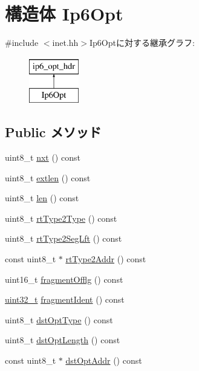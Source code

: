 \hypertarget{structNet_1_1Ip6Opt}{
\section{構造体 Ip6Opt}
\label{structNet_1_1Ip6Opt}
}


{\ttfamily \#include $<$inet.hh$>$}Ip6Optに対する継承グラフ:\begin{figure}[H]
\begin{center}
\leavevmode
\includegraphics[height=2cm]{structNet_1_1Ip6Opt}
\end{center}
\end{figure}
\subsection*{Public メソッド}
\begin{DoxyCompactItemize}
\item 
uint8\_\-t \hyperlink{structNet_1_1Ip6Opt_aa9a773e8c63669710e2900218d27c6ef}{nxt} () const 
\item 
uint8\_\-t \hyperlink{structNet_1_1Ip6Opt_a7534c13a4cde0c08f78d23e82ae8a95a}{extlen} () const 
\item 
uint8\_\-t \hyperlink{structNet_1_1Ip6Opt_a157a538f6c0e591c974744259b42d8f3}{len} () const 
\item 
uint8\_\-t \hyperlink{structNet_1_1Ip6Opt_ae4c748b4f01abc85d308a627b0278519}{rtType2Type} () const 
\item 
uint8\_\-t \hyperlink{structNet_1_1Ip6Opt_abd5ab0d9ec38e56938b883bf078a505e}{rtType2SegLft} () const 
\item 
const uint8\_\-t $\ast$ \hyperlink{structNet_1_1Ip6Opt_aa75855e56afe6f1a873a89ec9065eece}{rtType2Addr} () const 
\item 
uint16\_\-t \hyperlink{structNet_1_1Ip6Opt_abfef731b01a07ca7e0e74553e1c2a003}{fragmentOfflg} () const 
\item 
\hyperlink{Type_8hh_a435d1572bf3f880d55459d9805097f62}{uint32\_\-t} \hyperlink{structNet_1_1Ip6Opt_ad96851ce3053dc49058d578dd69a788a}{fragmentIdent} () const 
\item 
uint8\_\-t \hyperlink{structNet_1_1Ip6Opt_aa05fb424a60fa702a51de9d9910be690}{dstOptType} () const 
\item 
uint8\_\-t \hyperlink{structNet_1_1Ip6Opt_a6ee761d697e9f0054f319129b91e262e}{dstOptLength} () const 
\item 
const uint8\_\-t $\ast$ \hyperlink{structNet_1_1Ip6Opt_a7e470ca7eb55174fbce80124e7604633}{dstOptAddr} () const 
\end{DoxyCompactItemize}


